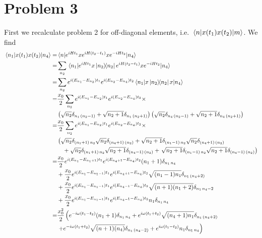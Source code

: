 \documentclass[a4paper,11pt]{article}
\begin{document}
\section*{Problem 3}
First we recalculate problem 2 for off-diagonal elements, i.e. $\mel{n}{x(t_1)x(t_2)}{m}$. We find
\begin{equation}
	\begin{aligned}
		\mel{n_1}{x(t_1)x(t_2)}{n_4}=&\mel{n}{e^{iHt_1}xe^{iH(t_2-t_1)}xe^{-iHt_2}}{n_4}\\
		=&\sum_{n_2}\mel{n_1}{e^{iHt_1}x\dyad{n_2}{n_2}e^{iH(t_2-t_1)}xe^{-iHt_2}}{n_4}
		\\
		=&\sum_{n_2} e^{i(E_{n_1}-E_{n_2})t_1}e^{i(E_{n_2}-E_{n_4})t_2}\mel{n_1}{x\dyad{n_2}{n_2}x}{n_4}
		\\
		=&\frac{x_0}{2}\sum_{n_2} e^{i(E_{n_1}-E_{n_2})t_1}e^{i(E_{n_2}-E_{n_4})t_2}\times \\
		&\left(\sqrt{n_2}\delta_{n_1\,(n_2-1)}+\sqrt{n_2+1}\delta_{n_1\,(n_2+1)}\right)\left(\sqrt{n_2}\delta_{n_4\,(n_2-1)}+\sqrt{n_2+1}\delta_{n_4\,(n_2+1)}\right)
		\\
		=&\frac{x_0}{2}\sum_{n_2} e^{i(E_{n_1}-E_{n_2})t_1}e^{i(E_{n_2}-E_{n_4})t_2}\times \\
		&\left(\sqrt{n_2}\delta_{(n_1+1)\,n_2}\sqrt{n_2}\delta_{(n_4+1)\,(n_2)}+\sqrt{n_2+1}\delta_{(n_1-1)\,n_2}\sqrt{n_2}\delta_{(n_4+1)\,(n_2)}\right.\\
		&\quad+\sqrt{n_2}\delta_{(n_1+1)\,n_2}\sqrt{n_2+1}\delta_{(n_4-1)\,(n_2)}+\left.\sqrt{n_2+1}\delta_{(n_1-1)\,n_2}\sqrt{n_2+1}\delta_{(n_4-1)\,(n_2)}\right)
		\\
	=&\frac{x_0}{2} e^{i(E_{n_1}-E_{n_1+1})t_1}e^{i(E_{n_4+1}-E_{n_4})t_2}(n_1+1)\delta_{n_1\,n_4}\\
	&+\frac{x_0}{2} e^{i(E_{n_1}-E_{n_1-1})t_1}e^{i(E_{n_4+1}-E_{n_4})t_2}\sqrt{(n_1-1)n_1}\delta_{n_1\,(n_4+2)}\\
	&+\frac{x_0}{2} e^{i(E_{n_1}-E_{n_1-1})t_1}e^{i(E_{n_4-1}-E_{n_4})t_2} \sqrt{(n+1)(n_1+2)}\delta_{n_1\,n_4-2}\\
	&+\frac{x_0}{2} e^{i(E_{n_1}-E_{n_1-1})t_1}e^{i(E_{n_4-1}-E_{n_4})t_2}n_1\delta_{n_1\,n_4}
		\\
=&\frac{x_0^2}{2}\left( e^{-i\omega (t_1-t_2)}(n_1+1)\delta_{n_1\,n_4}+ e^{i \omega (t_1+t_2)}\sqrt{(n_4+1)n_1}\delta_{n_1\,(n_4+2)}\right.\\
&\left.+ e^{-i\omega (t_1+t_2)}\sqrt{(n+1)(n_4)}\delta_{n_1\,(n_4-2)}+ e^{i\omega (t_1-t_2)}n_1\delta_{n_1\,n_4}\right)\\
	\end{aligned}
\end{equation}
\end{document}
